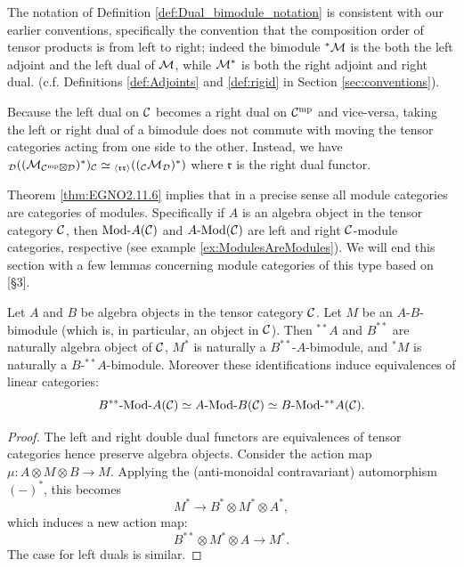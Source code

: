 \documentclass{amsart}
\begin{document}
\begin{remark}
	The notation of Definition \ref{def:Dual_bimodule_notation} is consistent with our earlier conventions, specifically the convention that the composition order of tensor products is from left to right; indeed the bimodule ${}^*\mathcal M$ is the both the left adjoint and the left dual of $\mathcal M$, while $\mathcal M^*$ is both the right adjoint and right dual. (c.f. Definitions \ref{def:Adjoints} and \ref{def:rigid} in Section \ref{sec:conventions}). 
\end{remark}

\begin{warning}
Because the left dual on $\mathcal C$ becomes a right dual on $\mathcal C^{\mathrm{mp}}$ and vice-versa, taking the left or right dual of a bimodule does not commute with moving the tensor categories acting from one side to the other.  Instead, we have ${}_\mathcal D ((\mathcal M_{\mathcal C^{\mathrm{mp}} \boxtimes \mathcal D})^*)_\mathcal C \simeq {}_{\langle \mathfrak{r r} \rangle}(({}_\mathcal C \mathcal M_\mathcal D)^*)$ where $\mathfrak{r}$ is the right dual functor.%
\end{warning}

Theorem \ref{thm:EGNO2.11.6} implies that in a precise sense all module categories are categories of modules. Specifically if $A$ is an algebra object in the tensor category $\mathcal C$, then $\Mod{}{A}(\cC)$ and $\Mod{A}{}(\cC)$ are left and right $\mathcal C$-module categories, respective (see example \ref{ex:ModulesAreModules}). We will end this section with a few lemmas concerning module categories of this type based on \cite{0404504}[\S 3].

\begin{lemma}
	Let $A$ and $B$ be algebra objects in the tensor category $\mathcal C$. Let $M$ be an $A$-$B$-bimodule (which is, in particular, an object in $\mathcal C$). Then ${}^{**}A$ and $B^{**}$ are naturally algebra object of $\mathcal C$, $M^*$ is naturally a $B^{**}$-$A$-bimodule, and ${}^*M$ is naturally a $B$-${}^{**}A$-bimodule. Moreover these identifications induce equivalences of linear categories:
	\begin{equation*}
		\Mod{B^{**}}{A}(\cC) \simeq \Mod{A}{B}(\cC) \simeq \Mod{B}{{}^{**}A}(\cC).
	\end{equation*}
\end{lemma}

\begin{proof}
	The left and right double dual functors are equivalences of tensor categories hence preserve algebra objects. Consider the action map $\mu:A \otimes M \otimes B \to M$. Applying the (anti-monoidal contravariant) automorphism $(-)^*$, this becomes
	\begin{equation*}
		M^* \to B^* \otimes M^* \otimes A^*,
	\end{equation*}
	which induces a new action map:
	\begin{equation*}
		B^{**} \otimes M^* \otimes A \to M^*.
	\end{equation*}
	The case for left duals is similar. 
\end{proof}
\end{document}
